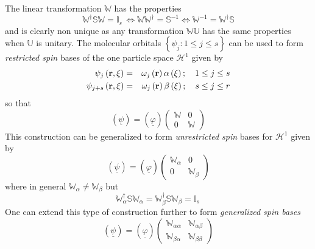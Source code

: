 \documentclass{article}
\begin{document}
The linear transformation $\mathbb{W}$ has the properties 
\begin{equation}
\mathbb{W}^{\dagger }\mathbb{SW}=\mathbb{I}_{s}\,\mathbb{\Longleftrightarrow
WW}^{\dagger }=\mathbb{S}^{-1}\mathbb{\Longleftrightarrow W}^{-1}=\mathbb{W}%
^{\dagger }\mathbb{S}
\end{equation}%
and is clearly non unique as any transformation $\mathbb{WU}$ has the same
properties when $\mathbb{U}$ is unitary. The molecular orbitals $\left\{
\psi _{j}:1\leq j\leq s\right\} $ can be used to form \emph{restricted spin }%
bases of the one particle space $\mathcal{H}^{1}$ given by 
\begin{eqnarray}
\psi _{j}\left( \mathbf{r},\xi \right) &=&\omega _{j}\left( \mathbf{r}%
\right) \alpha \left( \xi \right) ;\quad 1\leq j\leq s  \notag \\
\psi _{j+s}\left( \mathbf{r},\xi \right) &=&\omega _{j}\left( \mathbf{r}%
\right) \beta \left( \xi \right) ;\quad s\leq j\leq r
\end{eqnarray}%
so that 
\begin{equation}
\left( \underline{\psi }\right) =\left( \underline{\varphi }\right) \left( 
\begin{array}{cc}
\mathbb{W} & 0 \\ 
0 & \mathbb{W}%
\end{array}%
\right)
\end{equation}%
This construction can be generalized to form \emph{unrestricted spin }bases
for $\mathcal{H}^{1}$ given by 
\begin{equation}
\left( \underline{\psi }\right) =\left( \underline{\varphi }\right) \left( 
\begin{array}{cc}
\mathbb{W}_{\alpha } & 0 \\ 
0 & \mathbb{W}_{\beta }%
\end{array}%
\right)
\end{equation}%
where in general $\mathbb{W}_{\alpha }\neq \mathbb{W}_{\beta }$ but 
\begin{equation}
\mathbb{W}_{\alpha }^{\dagger }\mathbb{SW}_{\alpha }=\mathbb{W}_{\beta
}^{\dagger }\mathbb{SW}_{\beta }=\mathbb{I}_{s}\,
\end{equation}%
One can extend this type of construction further to form \emph{generalized
spin bases }%
\begin{equation}
\left( \underline{\psi }\right) =\left( \underline{\varphi }\right) \left( 
\begin{array}{cc}
\mathbb{W}_{\alpha \alpha } & \mathbb{W}_{\alpha \beta } \\ 
\mathbb{W}_{\beta \alpha } & \mathbb{W}_{\beta \beta }%
\end{array}%
\right)
\end{equation}%
\end{document}

